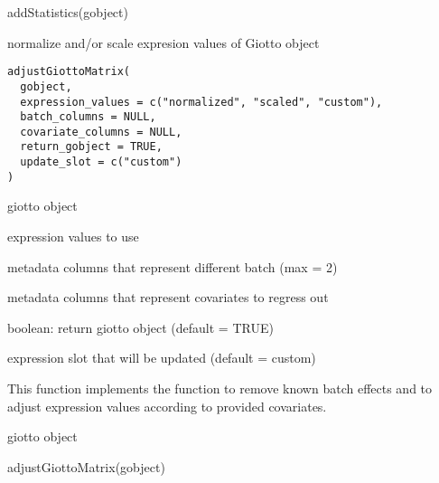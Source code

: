 \documentclass[a4paper]{book}
\begin{document}
%
\begin{Examples}
\begin{ExampleCode}
    addStatistics(gobject)
\end{ExampleCode}
\end{Examples}
%
\begin{Description}\relax
normalize and/or scale expresion values of Giotto object
\end{Description}
%
\begin{Usage}
\begin{verbatim}
adjustGiottoMatrix(
  gobject,
  expression_values = c("normalized", "scaled", "custom"),
  batch_columns = NULL,
  covariate_columns = NULL,
  return_gobject = TRUE,
  update_slot = c("custom")
)
\end{verbatim}
\end{Usage}
%
\begin{Arguments}
\begin{ldescription}
\item[\code{gobject}] giotto object

\item[\code{expression\_values}] expression values to use

\item[\code{batch\_columns}] metadata columns that represent different batch (max = 2)

\item[\code{covariate\_columns}] metadata columns that represent covariates to regress out

\item[\code{return\_gobject}] boolean: return giotto object (default = TRUE)

\item[\code{update\_slot}] expression slot that will be updated (default = custom)
\end{ldescription}
\end{Arguments}
%
\begin{Details}\relax
This function implements the  function to
remove known batch effects and to adjust expression values according to provided covariates.
\end{Details}
%
\begin{Value}
giotto object
\end{Value}
%
\begin{Examples}
\begin{ExampleCode}
    adjustGiottoMatrix(gobject)
\end{ExampleCode}
\end{Examples}
\end{document}
